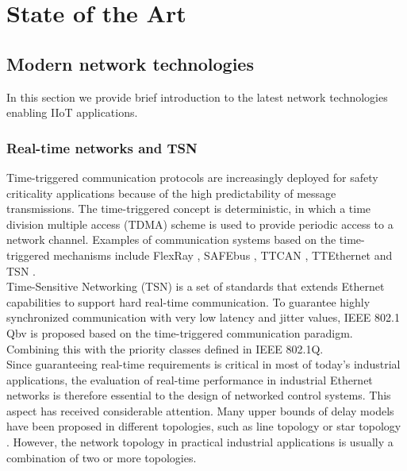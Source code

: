 \chapter{State of the Art}\label{sec:sota}\minitoc\vspace{.5cm}

\section{Modern network technologies}
In this section we provide brief introduction to the latest network technologies enabling IIoT applications.\\

\subsection{Real-time networks and TSN}
Time-triggered communication protocols are increasingly deployed for safety criticality applications because of the high predictability of message transmissions.
The time-triggered concept is deterministic, in which a time division multiple access (TDMA) scheme is used to provide periodic access to a network channel.
Examples of communication systems based on the time-triggered mechanisms include FlexRay \cite{4677484}, SAFEbus \cite{282179}, TTCAN \cite{7790660}, TTEthernet \cite{6622959} and TSN \cite{8275648}.\\

Time-Sensitive Networking (TSN) is a set of standards that extends Ethernet capabilities to support hard real-time communication.
To guarantee highly synchronized communication with very low latency and jitter values, IEEE 802.1 Qbv is proposed based on the time-triggered communication paradigm.
Combining this with the priority classes defined in IEEE 802.1Q\cite{8275648}.\\

Since guaranteeing real-time requirements is critical in most of today's industrial applications,
the evaluation of real-time performance in industrial Ethernet networks is therefore essential to the design of networked control systems.
This aspect has received considerable attention. Many upper bounds of delay models have been proposed in different topologies,
such as line topology or star topology \cite{WATSON2003251} \cite{1705659}.
However, the network topology in practical industrial applications is usually a combination of two or more topologies.\\

